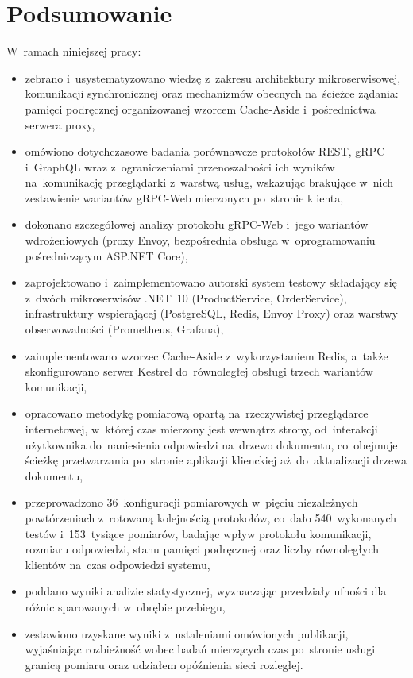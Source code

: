 \cleardoublepage
\chapter{Podsumowanie}

W~ramach niniejszej pracy:

\begin{itemize}
\item zebrano i~usystematyzowano wiedzę z~zakresu architektury mikroserwisowej, komunikacji synchronicznej oraz mechanizmów obecnych na~ścieżce żądania: pamięci podręcznej organizowanej wzorcem Cache-Aside i~pośrednictwa serwera proxy,
\item omówiono dotychczasowe badania porównawcze protokołów REST, gRPC i~GraphQL wraz z~ograniczeniami przenoszalności ich wyników na~komunikację przeglądarki z~warstwą usług, wskazując brakujące w~nich zestawienie wariantów gRPC-Web mierzonych po~stronie klienta,
\item dokonano szczegółowej analizy protokołu gRPC-Web i~jego wariantów wdrożeniowych (proxy Envoy, bezpośrednia obsługa w~oprogramowaniu pośredniczącym ASP.NET Core),
\item zaprojektowano i~zaimplementowano autorski system testowy składający się z~dwóch mikroserwisów .NET~10 (ProductService, OrderService), infrastruktury wspierającej (PostgreSQL, Redis, Envoy Proxy) oraz warstwy obserwowalności (Prometheus, Grafana),
\item zaimplementowano wzorzec Cache-Aside z~wykorzystaniem Redis, a~także skonfigurowano serwer Kestrel do~równoległej obsługi trzech wariantów komunikacji,
\item opracowano metodykę pomiarową opartą na~rzeczywistej przeglądarce internetowej, w~której czas mierzony jest wewnątrz strony, od~interakcji użytkownika do~naniesienia odpowiedzi na~drzewo dokumentu, co~obejmuje ścieżkę przetwarzania po~stronie aplikacji klienckiej aż~do~aktualizacji drzewa dokumentu,
\item przeprowadzono 36~konfiguracji pomiarowych w~pięciu niezależnych powtórzeniach z~rotowaną kolejnością protokołów, co~dało 540~wykonanych testów i~153~tysiące pomiarów, badając wpływ protokołu komunikacji, rozmiaru odpowiedzi, stanu pamięci podręcznej oraz liczby równoległych klientów na~czas odpowiedzi systemu,
\item poddano wyniki analizie statystycznej, wyznaczając przedziały ufności dla różnic sparowanych w~obrębie przebiegu,
\item zestawiono uzyskane wyniki z~ustaleniami omówionych publikacji, wyjaśniając rozbieżność wobec badań mierzących czas po~stronie usługi granicą pomiaru oraz udziałem opóźnienia sieci rozległej.
\end{itemize}

